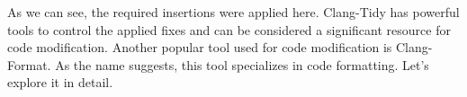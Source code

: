 As we can see, the required insertions were applied here. Clang-Tidy has powerful tools to control the applied fixes and can be considered a significant resource for code modification. Another popular tool used for code modification is Clang-Format. As the name suggests, this tool specializes in code formatting. Let's explore it in detail.



























































































